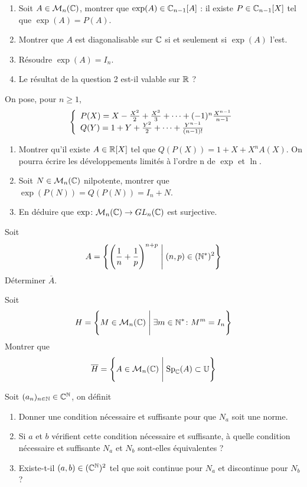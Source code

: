 \begin{exercise}
	\phantom{}
	\begin{enumerate}
		\item Soit $A\in\mathcal{M}_{n}(\mathbb{C})$, montrer que $\exp(A)\in\mathbb{C}_{n-1}[A]$ : il existe $P\in\mathbb{C}_{n-1}[X]$ tel que $\exp(A)=P(A)$.
		\item Montrer que $A$ est diagonalisable sur $\mathbb{C}$ si et seulement si $\exp(A)$ l'est.
		\item Résoudre $\exp(A)=I_{n}$.
		\item Le résultat de la question 2 est-il valable sur $\mathbb{R}$ ?
	\end{enumerate}
\end{exercise}

\begin{exercise}
	On pose, pour $n\geqslant1$,
	$$
	\left\{
		\begin{array}[]{l}
			P(X)=X-\frac{X^{2}}{2}+\frac{X^{3}}{3}+\dots+(-1)^{n}\frac{X^{n-1}}{n-1}\\
			Q(Y)=1+Y+\frac{Y^{2}}{2}+\dots+\frac{Y^{n-1}}{(n-1)!}
		\end{array}
	\right.
	$$
	\begin{enumerate}
		\item Montrer qu'il existe $A\in\mathbb{R}[X]$ tel que $Q(P(X))=1+X+X^{n}A(X)$. On pourra écrire les développements limités à l'ordre n de $\exp$ et $\ln$.
		\item Soit $N\in\mathcal{M}_{n}(\mathbb{C})$ nilpotente, montrer que $\exp(P(N))=Q(P(N))=I_{n}+N$.
		\item En déduire que $\exp\colon\mathcal{M}_{n}(\mathbb{C})\to GL_{n}(\mathbb{C})$ est surjective.
	\end{enumerate}
\end{exercise}

\begin{exercise}
	Soit 
	$$A=\Biggl\{\Biggl(\frac{1}{n}+\frac{1}{p}\Biggr)^{n+p}\Biggm|(n,p)\in(\mathbb{N}^{*})^{2}\Biggr\}$$
	Déterminer $\overline{A}$.
\end{exercise}

\begin{exercise}
	Soit 
	$$H=\Biggl\{M\in\mathcal{M}_{n}(\mathbb{C})\Biggm|\exists m\in\mathbb{N}^{*}\colon M^{m}=I_{n}\Biggr\}$$
	Montrer que 
	$$\overline{H}=\Biggl\{A\in\mathcal{M}_{n}(\mathbb{C})\Biggm|\operatorname{Sp}_{\mathbb{C}}(A)\subset\mathbb{U}\Biggr\}$$
\end{exercise}

\begin{exercise}
	Soit $(a_{n})_{n\in\mathbb{N}}\in\mathbb{C}^{\mathbb{N}}$, on définit 
	\begin{enumerate}
		\item Donner une condition nécessaire et suffisante pour que $N_{a}$ soit une norme.
		\item Si $a$ et $b$ vérifient cette condition nécessaire et suffisante, à quelle condition nécessaire et suffisante $N_{a}$ et $N_{b}$ sont-elles équivalentes ?
		\item Existe-t-il $(a,b)\in(\mathbb{C}^{\mathbb{N}})^{2}$ tel que  soit continue pour $N_{a}$ et discontinue pour $N_{b}$ ?
	\end{enumerate}
\end{exercise}

